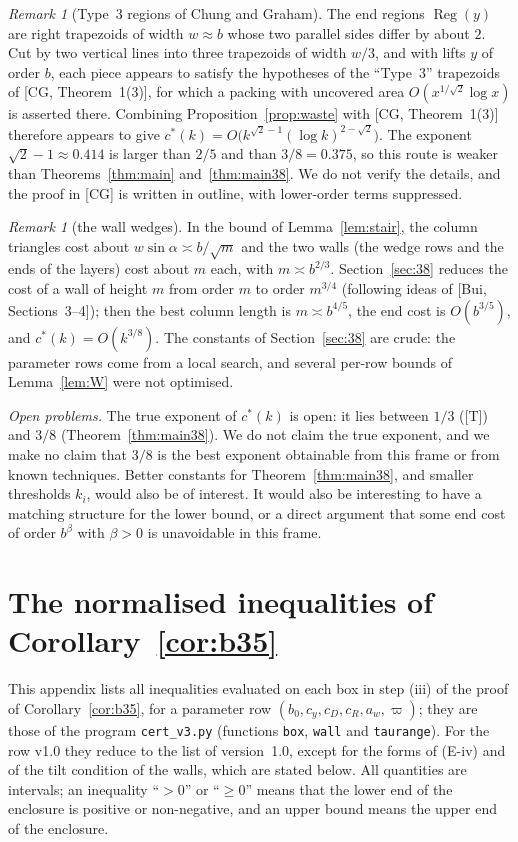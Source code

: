 \documentclass[11pt]{amsart}
\newcommand{\Reg}{\operatorname{Reg}}
\newcommand{\cs}{c^{*}}
\theoremstyle{definition}
\theoremstyle{remark}
\newtheorem{remark}[theorem]{Remark}
\numberwithin{equation}{section}
\begin{document}
\begin{remark}[Type~3 regions of Chung and Graham]\label{rem:cg3}
The end regions $\Reg(y)$ are right trapezoids of width $w\approx b$ whose two parallel sides differ by about $2$.
Cut by two vertical lines into three trapezoids of width $w/3$, and with lifts $y$ of order $b$, each piece appears to
satisfy the hypotheses of the ``Type~3'' trapezoids of [CG, Theorem~1(3)], for which a packing with uncovered area
$O(x^{1/\sqrt2}\log x)$ is asserted there. Combining Proposition~\ref{prop:waste} with [CG, Theorem~1(3)] therefore
appears to give $\cs(k)=O\bigl(k^{\sqrt2-1}(\log k)^{2-\sqrt2}\bigr)$. The exponent $\sqrt2-1\approx0.414$ is larger
than $2/5$ and than $3/8=0.375$, so this route is weaker than Theorems~\ref{thm:main} and~\ref{thm:main38}. We do not
verify the details, and the proof in [CG] is written in outline, with lower-order terms suppressed.
\end{remark}

\begin{remark}[the wall wedges]\label{rem:bui4}
In the bound of Lemma~\ref{lem:stair}, the column triangles cost about $w\sin\alpha\asymp b/\sqrt m$ and the two walls
(the wedge rows and the ends of the layers) cost about $m$ each, with $m\asymp b^{2/3}$. Section~\ref{sec:38} reduces the
cost of a wall of height $m$ from order $m$ to order $m^{3/4}$ (following ideas of [Bui, Sections~3--4]); then the best
column length is $m\asymp b^{4/5}$, the end cost is $O(b^{3/5})$, and $\cs(k)=O(k^{3/8})$. The constants of
Section~\ref{sec:38} are crude: the parameter rows come from a local search, and several per-row bounds of
Lemma~\ref{lem:W} were not optimised.
\end{remark}

\emph{Open problems.} The true exponent of $\cs(k)$ is open: it lies between $1/3$ ([T]) and $3/8$
(Theorem~\ref{thm:main38}). We do not claim the true exponent, and we make no claim that $3/8$ is the best exponent
obtainable from this frame or from known techniques. Better constants for Theorem~\ref{thm:main38}, and smaller
thresholds $k_i$, would also be of interest. It would also be interesting to have a matching structure for the lower bound, or a direct argument that
some end cost of order $b^{\beta}$ with $\beta>0$ is unavoidable in this frame.

\appendix
\section{The normalised inequalities of Corollary~\ref{cor:b35}}\label{app:enc}
This appendix lists all inequalities evaluated on each box in step (iii) of the proof of Corollary~\ref{cor:b35}, for a
parameter row $(b_0,c_y,c_D,c_R,a_w,\varpi)$; they are those of the program \texttt{cert\_v3.py} (functions
\texttt{box}, \texttt{wall} and \texttt{taurange}). For the row v1.0 they reduce to the list of version~1.0, except for
the forms of (E-iv) and of the tilt condition of the walls, which are stated below. All quantities are intervals; an
inequality ``$>0$'' or ``$\ge0$'' means that the lower end of the enclosure is positive or non-negative, and an upper
bound means the upper end of the enclosure.
\end{document}

